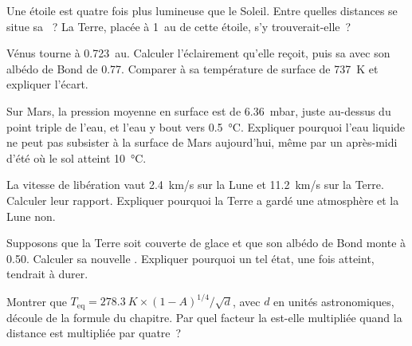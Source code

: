 \begin{exercise}[$\star\star$]\label{exo:g10:habitable-planet:7}
Une étoile est quatre fois plus lumineuse que le Soleil. Entre quelles
distances se situe sa ~? La Terre, placée à \qty{1}{au} de
cette étoile, s'y trouverait-elle~?
\end{exercise}

\begin{exercise}[$\star\star$]\label{exo:g10:habitable-planet:8}
Vénus tourne à \qty{0.723}{au}. Calculer l'éclairement qu'elle reçoit, puis
sa  avec son albédo de Bond de 0.77. Comparer à sa
température de surface de \qty{737}{K} et expliquer l'écart.
\end{exercise}

\begin{exercise}[$\star\star$]\label{exo:g10:habitable-planet:9}
Sur Mars, la pression moyenne en surface est de \qty{6.36}{mbar}, juste
au-dessus du point triple de l'eau, et l'eau y bout vers
\qty{0.5}{\degreeCelsius}. Expliquer pourquoi l'eau liquide ne peut pas
subsister à la surface de Mars aujourd'hui, même par un après-midi d'été où
le sol atteint \qty{10}{\degreeCelsius}.
\end{exercise}

\begin{exercise}[$\star\star$]\label{exo:g10:habitable-planet:10}
La vitesse de libération vaut \qty{2.4}{km/s} sur la Lune et
\qty{11.2}{km/s} sur la Terre. Calculer leur rapport. Expliquer pourquoi la
Terre a gardé une atmosphère et la Lune non.
\end{exercise}

\begin{exercise}[$\star\star$]\label{exo:g10:habitable-planet:11}
Supposons que la Terre soit couverte de glace et que son albédo de Bond
monte à 0.50. Calculer sa nouvelle . Expliquer
pourquoi un tel état, une fois atteint, tendrait à durer.
\end{exercise}

\begin{exercise}[$\star\star\star$]\label{exo:g10:habitable-planet:12}
Montrer que $T_{\mathrm{eq}} = \qty{278.3}{K} \times (1-A)^{1/4}/\sqrt{d}$,
avec $d$ en unités astronomiques, découle de la formule du chapitre. Par
quel facteur la  est-elle multipliée quand la
distance est multipliée par quatre~?
\end{exercise}

